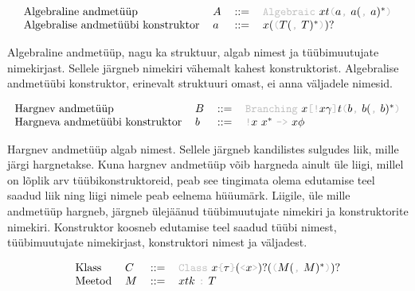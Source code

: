 \documentclass[12pt]{article}
\begin{document}
    \begin{equation*}
      \begin{tabular}{llll}
        Algebraline andmetüüp              & $A$ & $::=$ & {\color{helehall}\verb!Algebraic!} $xt${\color{helehall}\verb!(!}$a${\color{helehall}\verb!,!} $a(${\color{helehall}\verb!,!} $a)^*${\color{helehall}\verb!)!} \\
        Algebralise andmetüübi konstruktor & $a$ & $::=$ & $x(${\color{helehall}\verb!(!}$T(${\color{helehall}\verb!,!} $T)^*${\color{helehall}\verb!)!}$)?$
      \end{tabular}
    \end{equation*}

    Algebraline andmetüüp, nagu ka struktuur, algab nimest ja tüübimuutujate nimekirjast. Sellele järgneb nimekiri vähemalt kahest konstruktorist. Algebralise andmetüübi konstruktor, erinevalt struktuuri omast, ei anna väljadele nimesid.

    \begin{equation*}
      \begin{tabular}{llll}
        Hargnev andmetüüp               & $B$ & $::=$ & {\color{helehall}\verb!Branching!} $x${\color{helehall}\verb"[!"}$x\gamma${\color{helehall}\verb!]!}$t${\color{helehall}\verb!(!}$b${\color{helehall}\verb!,!} $b(${\color{helehall}\verb!,!} $b)^*${\color{helehall}\verb!)!} \\
        Hargneva andmetüübi konstruktor & $b$ & $::=$ & {\color{helehall}\verb"!"}$x$ $x^*$ {\color{helehall}\verb!->!} $x\phi$
      \end{tabular}
    \end{equation*}

    Hargnev andmetüüp algab nimest. Sellele järgneb kandilistes sulgudes liik, mille järgi hargnetakse. Kuna hargnev andmetüüp võib hargneda ainult üle liigi, millel on lõplik arv tüübikonstruktoreid, peab see tingimata olema edutamise teel saadud liik ning liigi nimele peab eelnema hüüumärk. Liigile, üle mille andmetüüp hargneb, järgneb ülejäänud tüübimuutujate nimekiri ja konstruktorite nimekiri. Konstruktor koosneb edutamise teel saadud tüübi nimest, tüübimuutujate nimekirjast, konstruktori nimest ja väljadest.

    \begin{equation*}
      \begin{tabular}{llll}
        Klass  & $C$ & $::=$ & {\color{helehall}\verb!Class!} $x${\color{helehall}\verb!{!}$\tau${\color{helehall}\verb!}!}$(${\color{helehall}\verb!<!}$x${\color{helehall}\verb!>!}$)?(${\color{helehall}\verb!(!}$M(${\color{helehall}\verb!,!} $M)^*${\color{helehall}\verb!)!}$)?$ \\
        Meetod & $M$ & $::=$ & $xtk$ {\color{helehall}\verb!:!} $T$
      \end{tabular}
    \end{equation*}
\end{document}
